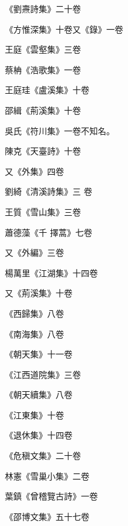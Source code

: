 \begin{pinyinscope}
 《劉燾詩集》二十卷



 《方惟深集》十卷又《錄》一卷



 王庭《雲壑集》三卷



 蔡柟《浩歌集》一卷



 王庭珪《盧溪集》十卷



 邵緝《荊溪集》十卷



 吳氏《符川集》一卷不知名。



 陳克《天臺詩》十卷



 又《外集》四卷



 劉綺《清溪詩集》三
 卷



 王質《雪山集》三卷


蕭德藻《千
 擇蒿》七卷



 又《外編》三卷



 楊萬里《江湖集》十四卷



 又《荊溪集》十卷



 《西歸集》八卷



 《南海集》八卷



 《朝天集》十一卷



 《江西道院集》三卷



 《朝天續集》八卷



 《江東集》十卷



 《退休集》十四卷



 《危稹文集》二十卷



 林憲《雪巢小集》二卷



 葉鎮《曾稽覽古詩》一卷



 《邵博文集》五十七卷




\end{pinyinscope}
